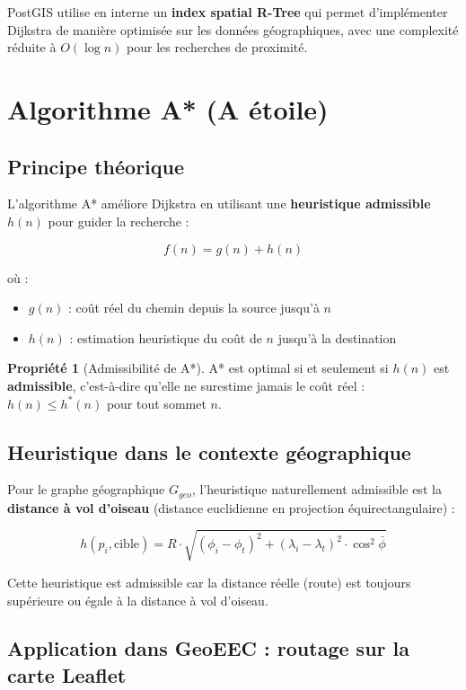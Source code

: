 \documentclass[12pt, a4paper]{report}
\theoremstyle{definition}
\newtheorem{propriete}{Propriété}[chapter]
\begin{document}
PostGIS utilise en interne un \textbf{index spatial R-Tree} qui permet d'implémenter Dijkstra de manière optimisée sur les données géographiques, avec une complexité réduite à $O(\log n)$ pour les recherches de proximité.

\section{Algorithme A* (A étoile)}

\subsection{Principe théorique}

L'algorithme A* améliore Dijkstra en utilisant une \textbf{heuristique admissible} $h(n)$ pour guider la recherche :

$$f(n) = g(n) + h(n)$$

où :
\begin{itemize}
  \item $g(n)$ : coût réel du chemin depuis la source jusqu'à $n$
  \item $h(n)$ : estimation heuristique du coût de $n$ jusqu'à la destination
\end{itemize}

\begin{propriete}[Admissibilité de A*]
A* est optimal si et seulement si $h(n)$ est \textbf{admissible}, c'est-à-dire qu'elle ne surestime jamais le coût réel : $h(n) \leq h^*(n)$ pour tout sommet $n$.
\end{propriete}

\subsection{Heuristique dans le contexte géographique}

Pour le graphe géographique $G_{geo}$, l'heuristique naturellement admissible est la \textbf{distance à vol d'oiseau} (distance euclidienne en projection équirectangulaire) :

$$h(p_i, \text{cible}) = R \cdot \sqrt{(\phi_i - \phi_t)^2 + (\lambda_i - \lambda_t)^2 \cdot \cos^2\bar{\phi}}$$

Cette heuristique est admissible car la distance réelle (route) est toujours supérieure ou égale à la distance à vol d'oiseau.

\subsection{Application dans GeoEEC : routage sur la carte Leaflet}
\end{document}
